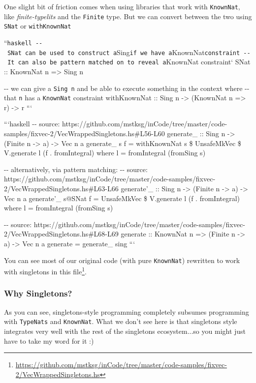 \documentclass[]{article}
\renewcommand{\href}[2]{#2\footnote{\url{#1}}}
\begin{document}
One slight bit of friction comes when using libraries that work with
\texttt{KnownNat}, like \emph{finite-typelits} and the \texttt{Finite} type. But
we can convert between the two using \texttt{SNat} or \texttt{withKnownNat}

``\texttt{haskell\ -\/-\ SNat\ can\ be\ used\ to\ construct\ a}Sing\texttt{if\ we\ have\ a}KnownNat\texttt{constraint\ -\/-\ It\ can\ also\ be\ pattern\ matched\ on\ to\ reveal\ a}KnownNat
constraint` SNat :: KnownNat n =\textgreater{} Sing n

-\/- we can give a \texttt{Sing\ n} and be able to execute something in the
context where -\/- that \texttt{n} has a \texttt{KnownNat} constraint
withKnownNat :: Sing n -\textgreater{} (KnownNat n =\textgreater{} r)
-\textgreater{} r ```

```haskell -\/- source:
https://github.com/mstksg/inCode/tree/master/code-samples/fixvec-2/VecWrappedSingletons.hs\#L56-L60
generate\_ :: Sing n -\textgreater{} (Finite n -\textgreater{} a)
-\textgreater{} Vec n a generate\_ s f = withKnownNat s \$ UnsafeMkVec \$
V.generate l (f . fromIntegral) where l = fromIntegral (fromSing s)

-\/- alternatively, via pattern matching: -\/- source:
https://github.com/mstksg/inCode/tree/master/code-samples/fixvec-2/VecWrappedSingletons.hs\#L63-L66
generate'\_ :: Sing n -\textgreater{} (Finite n -\textgreater{} a)
-\textgreater{} Vec n a generate'\_ s@SNat f = UnsafeMkVec \$ V.generate l (f .
fromIntegral) where l = fromIntegral (fromSing s)

-\/- source:
https://github.com/mstksg/inCode/tree/master/code-samples/fixvec-2/VecWrappedSingletons.hs\#L68-L69
generate :: KnownNat n =\textgreater{} (Finite n -\textgreater{} a)
-\textgreater{} Vec n a generate = generate\_ sing ```

You can see most of our original code (with pure \texttt{KnownNat}) rewritten to
work with singletons in
\href{https://github.com/mstksg/inCode/tree/master/code-samples/fixvec-2/VecWrappedSingletons.hs}{this
file}.

\subsubsection{Why Singletons?}

As you can see, singletons-style programming completely subsumes programming
with \texttt{TypeNats} and \texttt{KnownNat}. What we don't see here is that
singletons style integrates very well with the rest of the singletons
ecosystem...so you might just have to take my word for it :)
\end{document}

